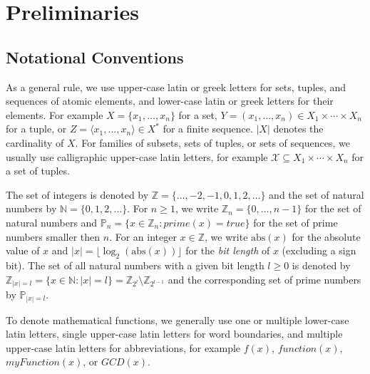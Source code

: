 \documentclass[bibtotoc,halfparskip,oneside]{scrreprt}
\begin{document}
\chapter{Preliminaries}

\section{Notational Conventions}

As a general rule, we use upper-case latin or greek letters for sets, tuples, and sequences of atomic elements, and lower-case latin or greek letters for their elements. For example $X=\{x_1,\ldots,x_n\}$ for a set, $Y=(x_1,\ldots,x_n)\in X_1\times\cdots\times X_n$ for a tuple, or $Z=\langle x_1,\ldots,x_n\rangle \in X^*$ for a finite sequence. $|X|$ denotes the cardinality of $X$. For families of subsets, sets of tuples, or sets of sequences, we usually use calligraphic upper-case latin letters, for example $\mathcal{X}\subseteq X_1\times\cdots\times X_n$ for a set of tuples.

The set of integers is denoted by $\mathbb{Z}=\{\ldots,-2,-1,0,1,2,\ldots\}$ and the set of natural numbers by $\mathbb{N}=\{0,1,2,\ldots\}$. For $n\geq 1$, we write $\mathbb{Z}_n=\{0,\ldots,n-1\}$ for the set of natural numbers and $\mathbb{P}_n=\{x\in\mathbb{Z}_n:\mathit{prime}(x)=\mathit{true}\}$ for the set of prime numbers smaller then $n$. For an integer $x\in\mathbb{Z}$, we write $\mathrm{abs}(x)$ for the absolute value of $x$ and $|x|=\lfloor\log_2(\mathrm{abs}(x))\rfloor$ for the \emph{bit length} of $x$ (excluding a sign bit). The set of all natural numbers with a given bit length $l\geq 0$ is denoted by $\mathbb{Z}_{|x|=l}=\{x\in\mathbb{N}:|x|=l\}=\mathbb{Z}_{2^l}\setminus\mathbb{Z}_{2^{l-1}}$ and the corresponding set of prime numbers by $\mathbb{P}_{|x|=l}$.

To denote mathematical functions, we generally use one or multiple lower-case latin letters, single upper-case latin letters for word boundaries, and multiple upper-case latin letters for abbreviations, for example $f(x)$, $\mathit{function}(x)$, $\mathit{myFunction}(x)$, or $\mathit{GCD}(x)$.
\end{document}
